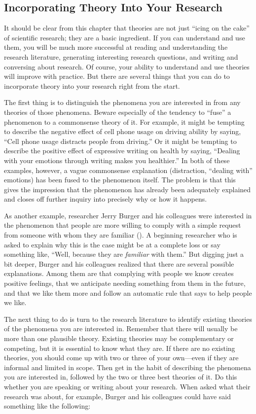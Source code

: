 \documentclass[
]{krantz}
\begin{document}
\subsection*{Incorporating Theory Into Your Research}\label{incorporating-theory-into-your-research}


It should be clear from this chapter that theories are not just ``icing on the cake'' of scientific research; they are a basic ingredient. If you can understand and use them, you will be much more successful at reading and understanding the research literature, generating interesting research questions, and writing and conversing about research. Of course, your ability to understand and use theories will improve with practice. But there are several things that you can do to incorporate theory into your research right from the start.

The first thing is to distinguish the phenomena you are interested in from any theories of those phenomena. Beware especially of the tendency to ``fuse'' a phenomenon to a commonsense theory of it. For example, it might be tempting to describe the negative effect of cell phone usage on driving ability by saying, ``Cell phone usage distracts people from driving.'' Or it might be tempting to describe the positive effect of expressive writing on health by saying, ``Dealing with your emotions through writing makes you healthier.'' In both of these examples, however, a vague commonsense explanation (distraction, ``dealing with'' emotions) has been fused to the phenomenon itself. The problem is that this gives the impression that the phenomenon has already been adequately explained and closes off further inquiry into precisely why or how it happens.

As another example, researcher Jerry Burger and his colleagues were interested in the phenomenon that people are more willing to comply with a simple request from someone with whom they are familiar (). A beginning researcher who is asked to explain why this is the case might be at a complete loss or say something like, ``Well, because they are \emph{familiar} with them.'' But digging just a bit deeper, Burger and his colleagues realized that there are several possible explanations. Among them are that complying with people we know creates positive feelings, that we anticipate needing something from them in the future, and that we like them more and follow an automatic rule that says to help people we like.

The next thing to do is turn to the research literature to identify existing theories of the phenomena you are interested in. Remember that there will usually be more than one plausible theory. Existing theories may be complementary or competing, but it is essential to know what they are. If there are no existing theories, you should come up with two or three of your own---even if they are informal and limited in scope. Then get in the habit of describing the phenomena you are interested in, followed by the two or three best theories of it. Do this whether you are speaking or writing about your research. When asked what their research was about, for example, Burger and his colleagues could have said something like the following:
\end{document}
